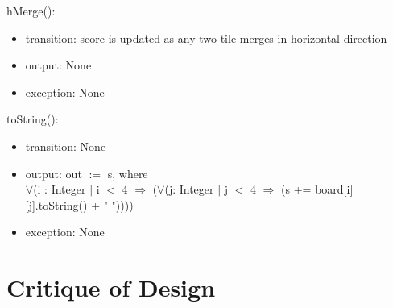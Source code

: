 \documentclass[12pt]{article}
\begin{document}
\noindent hMerge():
\begin{itemize}
  \item transition: score is updated as any two tile merges in horizontal direction
  \item output: None
  \item exception: None
\end{itemize}

\noindent toString():
\begin{itemize}
  \item transition: None
  \item output: out $:=$ s, where\\
  $\forall$(i : Integer $|$ i $<$ 4 $\Rightarrow$ ($\forall$(j: Integer $|$ j $<$ 4 $\Rightarrow$ (s += board[i][j].toString() + "   "))))
  \item exception: None
\end{itemize}

\newpage


\section*{Critique of Design}
\end{document}
